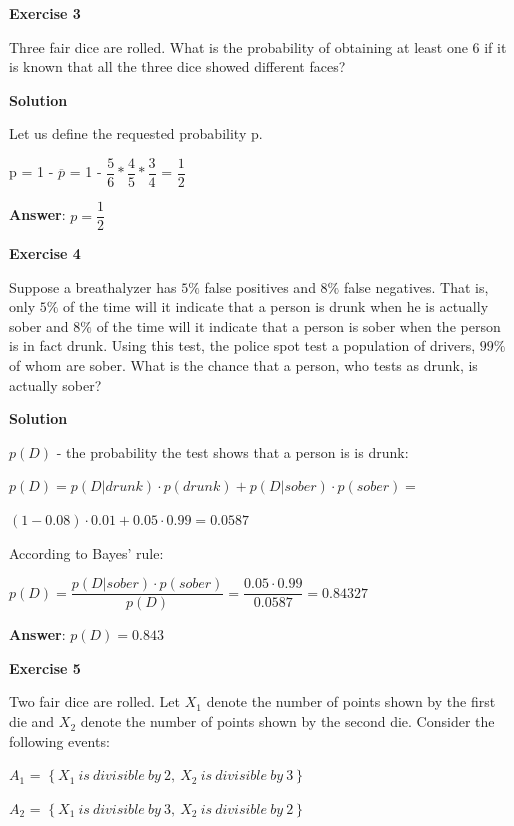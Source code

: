 \documentclass[12pt]{article}
\theoremstyle{definiton}
\theoremstyle{definition}
\theoremstyle{definition}
\begin{document}
		\textbf{Exercise 3}
		
		Three fair dice are rolled. What is the probability of obtaining at least one 6 if it is known that all the three dice showed different faces?

		\medskip
		
		\textbf{Solution}
		
Let us define the requested probability p.

p = 1 - $\overline{p}$ = 1 - $\dfrac{5}{6}*\dfrac{4}{5}*\dfrac{3}{4}$ = $\dfrac{1}{2}$
		
		\medskip
		\textbf{Answer}: $p = \dfrac{1}{2}$
		
		\bigskip
		
		\textbf{Exercise 4}
		
Suppose a breathalyzer has $5\%$  false positives and $8\%$ false negatives. That is, only $5\%$ of the time will it indicate that a person is drunk when he is actually sober and $8\%$ of the time will it indicate that a person is sober when the person is in fact drunk. Using this test, the police spot test a population of drivers, $99\%$ of whom are sober.
What is the chance that a person, who tests as drunk, is actually sober?

		\medskip
		
		\textbf{Solution}

		$p\left(D\right)$ - the probability the test shows that a person is is drunk:
		
		$p\left(D\right) = p\left(D|drunk\right)\cdotp p \left(drunk\right)+p\left(D|sober\right)\cdot p\left(sober\right) =$
		
$\left(1-0.08\right)\cdot 0.01+0.05\cdot 0.99 = 0.0587$
		
		According to Bayes' rule:
		
		$p\left(D\right)=\dfrac{p(D|sober)\cdot p\left(sober\right)}{p\left(D\right)}=\dfrac{0.05\cdot 0.99}{0.0587}=0.84327$
		
		\medskip
		\textbf{Answer}: $p\left(D\right) = 0.843$
		
		\bigskip
		
		\textbf{Exercise 5}
		
		Two fair dice are rolled. Let $X_1$ denote the number of points shown by the first die and $X_2$ denote the number of points shown by the second die. Consider the following events:
		
$A_1$ = $\left\lbrace X_1\ is\ divisible\ by\ 2,\ X_2\ is\ divisible\ by\ 3 \right\rbrace$

$A_2$ = $\left\lbrace X_1\ is\ divisible\ by\ 3,\ X_2\ is\ divisible\ by\ 2 \right\rbrace$
\end{document}
